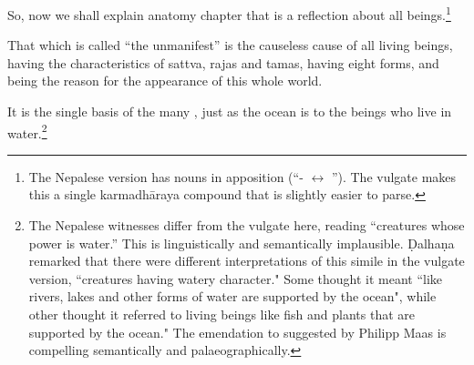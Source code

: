 \begin{translation}
    
    \item [1] 
    
    So, now we shall explain anatomy chapter that is a reflection about all 
    beings.\footnote{The Nepalese version has nouns in apposition 
    (“- $\leftrightarrow$ ”).  The vulgate makes this a 
    single 
    karmadhāraya compound that is slightly easier to parse.} 
    
\item[3]


That which is called “the unmanifest” is the causeless cause of all living beings,  
having the characteristics of sattva, rajas and tamas, having eight forms, and 
being the reason for the appearance of this whole world.
    
It is the single basis of the many , just as the ocean is to the beings who live in
water.\footnote{The Nepalese witnesses differ from the vulgate here,
    reading  “creatures whose power is water.”  This is
    linguistically and semantically implausible. Ḍalhaṇa remarked that
    there were different interpretations of this simile in the vulgate
    version,  “creatures having watery character." Some
    thought it meant ``like rivers, lakes and other forms of water are
    supported by the ocean", while other thought it referred to living
    beings like fish and plants that are supported by the ocean." The
    emendation to  suggested by Philipp Maas is compelling
    semantically and palaeographically.}
    
\item[3.1.4]
\label{3.1.4}


\end{translation}
